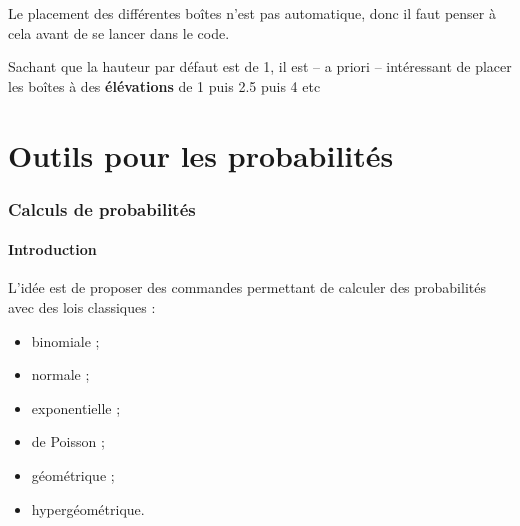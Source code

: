 \documentclass{article}
\newcommand\Cle[1]{{\bfseries\sffamily\textlangle #1\textrangle}}
\begin{document}
\begin{codetex}[]
\begin{tikzpicture}
	\PLboitemoustaxe[min=8,max=21,affvaleurs,valeurs={8,9,...,21},elargir=0.02]
	\PLboitemoust[parametres={10/15/17/19/20},moyenne=18.5,couleur=blue]
	\PLboitemoust[elevation=2.5,parametres={8/10/11/12/15},couleur=red]
	\PLboitemoust[elevation=4,parametres={10/14/14.5/16/21},couleur=ForestGreen,remplir=ForestGreen!25]
\end{tikzpicture}
\end{codetex}

\begin{codeinfo}
Le placement des différentes boîtes n'est pas automatique, donc il faut penser à cela avant de se lancer dans le code.

Sachant que la hauteur par défaut est de 1, il est -- a priori -- intéressant de placer les boîtes à des \Cle{élévations} de \num{1} puis \num{2.5} puis \num{4} etc
\end{codeinfo}

\newpage

\part{Outils pour les probabilités}

\section{Calculs de probabilités}\label{calcprobas}

\subsection{Introduction}

\begin{codeidee}
L'idée est de proposer des commandes permettant de calculer des probabilités avec des lois classiques :

\begin{itemize}
	\item binomiale ;
	\item normale ;
	\item exponentielle ;
	\item de Poisson ;
	\item géométrique ;
	\item hypergéométrique.
\end{itemize}
\end{codeidee}
\end{document}
